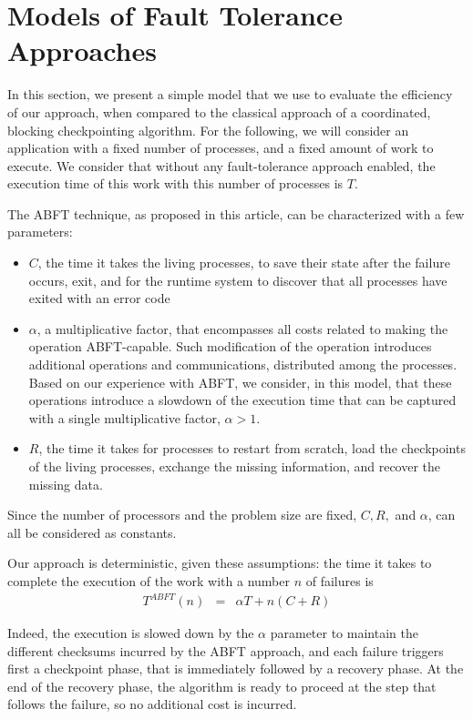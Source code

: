 \section{Models of Fault Tolerance Approaches\label{sec:model}}

In this section, we present a simple model that we use to evaluate the
efficiency of our approach, when compared to the classical approach of
a coordinated, blocking checkpointing algorithm. For the following,
we will consider an application with a fixed number of processes, and
a fixed amount of work to execute. We consider that without any
fault-tolerance approach enabled, the execution time of this work with
this number of processes is $T$.

The ABFT technique, as proposed in this article, can be characterized
with a few parameters:
\begin{itemize}
\item $C$, the time it takes the living processes, to save their state
  after the failure occurs, exit, and for the runtime system to
  discover that all processes have exited with an error code
\item $\alpha$, a multiplicative factor, that encompasses all costs
  related to making the operation ABFT-capable. Such modification of
  the operation introduces additional operations and communications,
  distributed among the processes. Based on our experience with ABFT,
  we consider, in this model, that these operations introduce a
  slowdown of the execution time that can be captured with a single
  multiplicative factor, $\alpha > 1$.
\item $R$, the time it takes for processes to restart from scratch,
  load the checkpoints of the living processes, exchange the missing
  information, and recover the missing data.
\end{itemize}
Since the number of processors and the problem size are fixed, $C, R,$
and $\alpha$, can all be considered as constants.

Our approach is deterministic, given these assumptions: the time it
takes to complete the execution of the work with a number $n$ of
failures is 
\begin{eqnarray}
T^{ABFT}(n) &=& \alpha T + n ( C + R )
\end{eqnarray}

Indeed, the execution is slowed down by the $\alpha$ parameter to
maintain the different checksums incurred by the ABFT approach, and
each failure triggers first a checkpoint phase, that is immediately
followed by a recovery phase. At the end of the recovery phase, the
algorithm is ready to proceed at the step that follows the failure, so
no additional cost is incurred.

